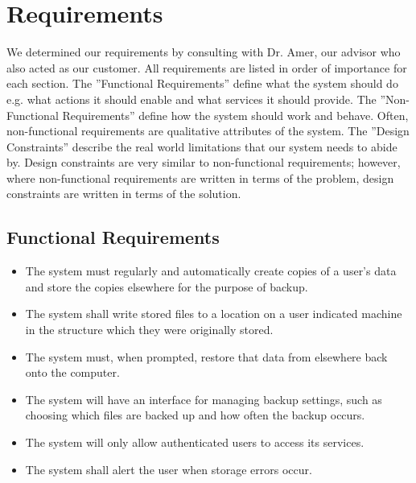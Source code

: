 \chapter {Requirements}

We determined our requirements by consulting with Dr. Amer, our advisor who also acted as our customer.  All requirements are listed in order of importance for each section.  The ''Functional Requirements'' define what the system should do e.g. what actions it should enable and what services it should provide.  The ''Non-Functional Requirements'' define how the system should work and behave.  Often, non-functional requirements are qualitative attributes of the system.  The ''Design Constraints'' describe the real world limitations that our system needs to abide by.  Design constraints are very similar to non-functional requirements; however, where non-functional requirements are written in terms of the problem, design constraints are written in terms of the solution.

\section {Functional Requirements}

	\begin{itemize}
		\item The system must regularly and automatically create copies of a user's data and store the copies elsewhere for the purpose of backup.

		\item The system shall write stored files to a location on a user indicated machine in the structure which they were originally stored.

		\item The system must, when prompted, restore that data from elsewhere back onto the computer.

		\item The system will have an interface for managing backup settings, such as choosing which files are backed up and how often the backup occurs.

		\item The system will only allow authenticated users to access its services.

		\item The system shall alert the user when storage errors occur.

	\end{itemize}

